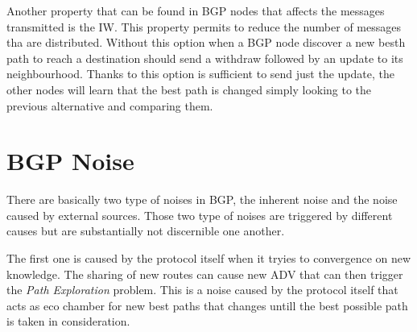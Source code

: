 Another property that can be found in \ac{BGP} nodes that affects the messages
transmitted is the \ac{IW}.
This property permits to reduce the number of messages tha are distributed.
Without this option when a \ac{BGP} node discover a new besth path to reach
a destination should send a withdraw followed by an update to its neighbourhood.
Thanks to this option is sufficient to send just the update, the other nodes 
will learn that the best path is changed simply looking to the previous 
alternative and comparing them.


%

\section{BGP Noise}
\label{sec:bgp_noise}

There are basically two type of noises in \ac{BGP}, the inherent noise and the 
noise caused by external sources.
Those two type of noises are triggered by different causes but are substantially
not discernible one another.

The first one is caused by the protocol itself when it tryies to convergence 
on new knowledge.
The sharing of new routes can cause new \ac{ADV} that can then trigger the
\textit{Path Exploration} problem.
This is a noise caused by the protocol itself that acts as eco chamber for 
new best paths that changes untill the best possible path is taken in consideration.

